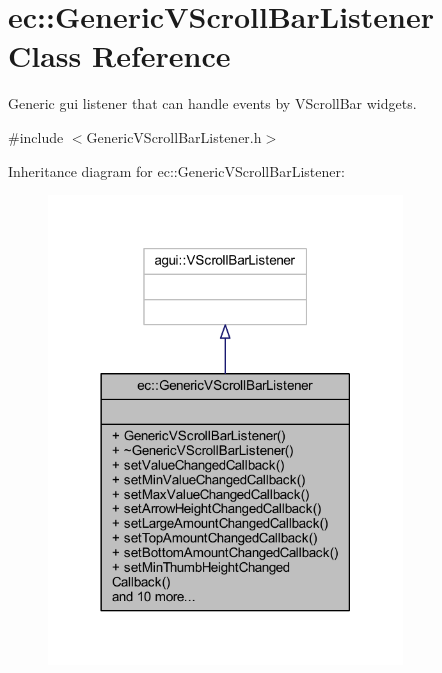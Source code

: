 \hypertarget{classec_1_1_generic_v_scroll_bar_listener}{}\section{ec\+:\+:Generic\+V\+Scroll\+Bar\+Listener Class Reference}
\label{classec_1_1_generic_v_scroll_bar_listener}


Generic gui listener that can handle events by V\+Scroll\+Bar widgets.  




{\ttfamily \#include $<$Generic\+V\+Scroll\+Bar\+Listener.\+h$>$}



Inheritance diagram for ec\+:\+:Generic\+V\+Scroll\+Bar\+Listener\+:\nopagebreak
\begin{figure}[H]
\begin{center}
\leavevmode
\includegraphics[width=266pt]{classec_1_1_generic_v_scroll_bar_listener__inherit__graph}
\end{center}
\end{figure}


